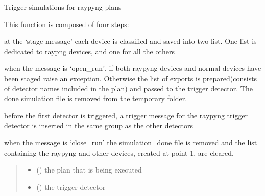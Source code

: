 \documentclass[letterpaper,10pt,english]{sphinxmanual}
\begin{document}
\begin{fulllineitems}
\label{\detokenize{API:raypyng_bluesky.preprocessor.trigger_sim}}
\pysigstartsignatures
{}
\pysigstopsignatures
\sphinxAtStartPar
Trigger simulations for raypyng plans

\sphinxAtStartPar
This function is composed of four steps:
\begin{description}
\sphinxAtStartPar
at the ‘stage message’ each device is classified
and saved into two list. One list is dedicated to
raypng devices, and one for all the others

\sphinxAtStartPar
when the message is ‘open\_run’, if both raypyng
devices and normal devices have been staged raise
an exception. Otherwise the list of exports is
prepared(consists of detector names included in the plan)
and passed to the trigger detector.
The done simulation file is removed from the
temporary folder.

\sphinxAtStartPar
before the first detector is triggered, a trigger
message for the raypyng trigger detector is inserted
in the same group as the other detectors

\sphinxAtStartPar
when the message is ‘close\_run’ the simulation\_done
file is removed and the list containing the raypyng and
other devices, created at point 1, are cleared.

\end{description}
\begin{quote}\begin{description}
\begin{itemize}
\item {} 
\sphinxAtStartPar
{} () \textendash{} the plan that is being executed

\item {} 
\sphinxAtStartPar
{} ({\hyperref[\detokenize{API:raypyng_bluesky.detector.RaypyngTriggerDetector}]{}}) \textendash{} the trigger detector


\end{itemize}
\end{description}
\end{quote}
\end{fulllineitems}
\end{document}
